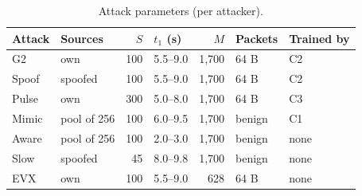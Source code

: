 \begin{table}[t]
\centering
\caption{Attack parameters (per attacker).}
\label{tab:attacks}
\footnotesize
\setlength{\tabcolsep}{3pt}
\begin{tabular}{llrlrll}
\toprule
Attack & Sources & $S$ & $t_1$ (s) & $M$ & Packets & Trained by \\
\midrule
G2 & own & 100 & 5.5--9.0 & 1{,}700 & 64 B & C2 \\
Spoof & spoofed & 100 & 5.5--9.0 & 1{,}700 & 64 B & C2 \\
Pulse & own & 300 & 5.0--8.0 & 1{,}700 & 64 B & C3 \\
Mimic & pool of 256 & 100 & 6.0--9.5 & 1{,}700 & benign & C1 \\
Aware & pool of 256 & 100 & 2.0--3.0 & 1{,}700 & benign & none \\
Slow & spoofed & 45 & 8.0--9.8 & 1{,}700 & benign & none \\
EVX & own & 100 & 5.5--9.0 & 628 & 64 B & none \\
\bottomrule
\end{tabular}
\end{table}
